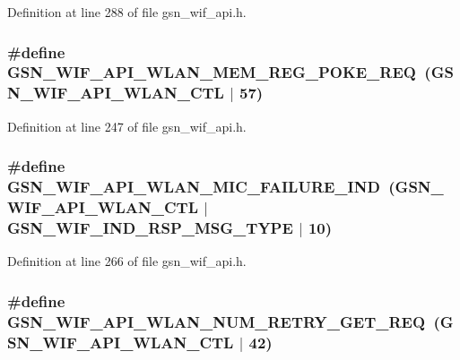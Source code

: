 Definition at line 288 of file gsn\_\-wif\_\-api.h.

\hypertarget{a00606_a68f6cdb031dae6063c330460e4f89acd}{
\subsubsection[{GSN\_\-WIF\_\-API\_\-WLAN\_\-MEM\_\-REG\_\-POKE\_\-REQ}]{\setlength{\rightskip}{0pt plus 5cm}\#define GSN\_\-WIF\_\-API\_\-WLAN\_\-MEM\_\-REG\_\-POKE\_\-REQ~(GSN\_\-WIF\_\-API\_\-WLAN\_\-CTL $|$ 57)}}
\label{a00606_a68f6cdb031dae6063c330460e4f89acd}


Definition at line 247 of file gsn\_\-wif\_\-api.h.

\hypertarget{a00606_aa9c3f26b1df9c3628d11fd1c9be77617}{
\subsubsection[{GSN\_\-WIF\_\-API\_\-WLAN\_\-MIC\_\-FAILURE\_\-IND}]{\setlength{\rightskip}{0pt plus 5cm}\#define GSN\_\-WIF\_\-API\_\-WLAN\_\-MIC\_\-FAILURE\_\-IND~(GSN\_\-WIF\_\-API\_\-WLAN\_\-CTL $|$ GSN\_\-WIF\_\-IND\_\-RSP\_\-MSG\_\-TYPE $|$ 10)}}
\label{a00606_aa9c3f26b1df9c3628d11fd1c9be77617}


Definition at line 266 of file gsn\_\-wif\_\-api.h.

\hypertarget{a00606_aaa22a6abee1aef348294034350fb93c2}{
\subsubsection[{GSN\_\-WIF\_\-API\_\-WLAN\_\-NUM\_\-RETRY\_\-GET\_\-REQ}]{\setlength{\rightskip}{0pt plus 5cm}\#define GSN\_\-WIF\_\-API\_\-WLAN\_\-NUM\_\-RETRY\_\-GET\_\-REQ~(GSN\_\-WIF\_\-API\_\-WLAN\_\-CTL $|$ 42)}}
\label{a00606_aaa22a6abee1aef348294034350fb93c2}


